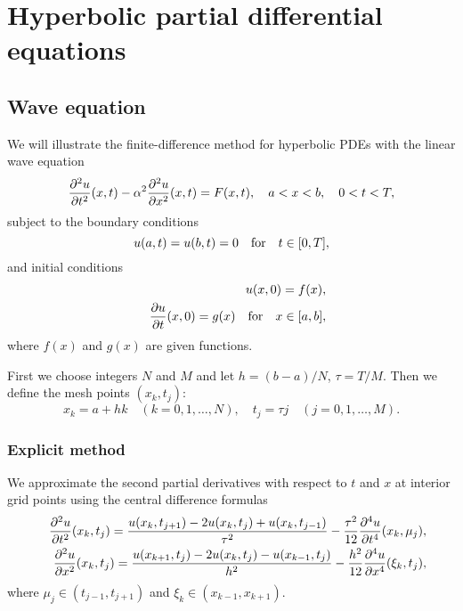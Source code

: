 %
%
%


\section{Hyperbolic partial differential equations}


\subsection{Wave equation}

 
We will illustrate the finite-difference
method for hyperbolic PDEs with the linear wave equation
\begin{equation}
\frac{{\partial}^{2} u}{{\partial} t^{2}}(x,t) - \alpha^{2}\frac{{\partial}^{2} u}{{\partial}
x^{2}}(x,t)=F(x,t), \quad a<x< b, \quad 0<t<T,   \label{1}
\end{equation}
subject to the boundary conditions
\begin{equation}
u(a, t) = u(b, t)=0 \quad \hbox{for} \quad t\in[0,T],   \label{2}
\end{equation}
and initial conditions
\begin{eqnarray}
&&u(x, 0) = f(x), \label{3} \\
&&\frac{{\partial} u}{{\partial} t}(x,0)=g(x)  \quad \hbox{for} \quad x\in[a,b],
\label{4}
\end{eqnarray}
where $f(x)$ and $g(x)$ are given functions.

   
First we choose integers $N$ and $M$ and
let $h=(b-a)/N$, $\tau=T/M$. Then we define the mesh points
$(x_{k}, t_{j})$:
\[
x_{k}=a+hk \quad(k=0,1,\dots,N), \quad t_{j}=\tau j
\quad(j=0,1,\dots,M).
\]


\subsubsection{Explicit method}
We approximate the second partial derivatives with respect to $t$
and $x$ at interior grid points using the central difference
formulas
\begin{eqnarray}
&&\frac{{\partial}^{2} u}{{\partial} t^{2}}(x_{k},t_{j})=
\frac{u(x_{k},t_{j+1})-2u(x_{k},t_{j})+u(x_{k},t_{j-1})}{\tau^{2}}-
\frac{\tau^{2}}{12}\frac{{\partial}^{4} u}{{\partial} t^{4}}(x_{k}, \mu_{j}), \nonumber \\
&&\frac{{\partial}^{2} u}{{\partial} x^{2}}(x_{k},t_{j})= \frac{u(x_{k+1},
t_{j})-2u(x_{k},t_{j})-u(x_{k-1}, t_{j})}{h^{2}}-
\frac{h^{2}}{12}\frac{{\partial}^{4} u}{{\partial} x^{4}}(\xi_{k}, t_{j}),
\nonumber
\end{eqnarray}
where $\mu_{j}\in(t_{j-1},t_{j+1})$ and
$\xi_{k}\in(x_{k-1},x_{k+1})$.

